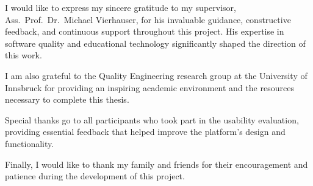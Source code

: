 I would like to express my sincere gratitude to my supervisor, Ass.\ Prof.\ Dr.\ Michael Vierhauser,
for his invaluable guidance, constructive feedback, and continuous support throughout this project.
His expertise in software quality and educational technology significantly shaped the direction of this work.

I am also grateful to the Quality Engineering research group at the University of Innsbruck for
providing an inspiring academic environment and the resources necessary to complete this thesis.

Special thanks go to all participants who took part in the usability evaluation, providing essential
feedback that helped improve the platform's design and functionality.

Finally, I would like to thank my family and friends for their encouragement and patience during
the development of this project.
